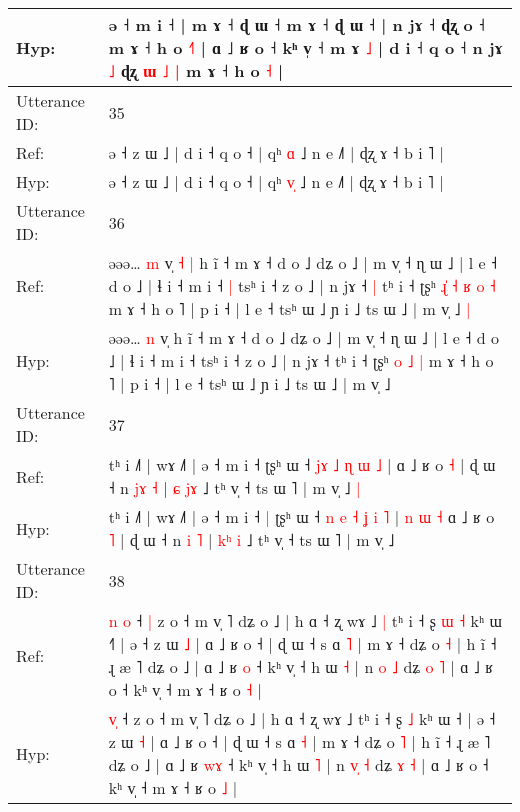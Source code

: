 \documentclass[10pt]{article}
\DeclareRobustCommand{\hl}[1]{{\textcolor{red}{#1}}}
\begin{document}
\begin{longtable}{ll}
 \\
Hyp: & ə ˧ m i ˧ | m ɤ ˧ ɖ ɯ ˧ m ɤ ˧ ɖ ɯ ˧ | n jɤ ˧\hl{}\hl{} ɖʐ\hl{}\hl{}\hl{}\hl{}\hl{}\hl{} o ˧ m ɤ ˧ h o \hl{˧}˥ | ɑ ˩ ʁ o ˧\hl{}\hl{} kʰ v̩ ˧ m\hl{}\hl{}\hl{}\hl{} \hl{}ɤ \hl{˩} | d i ˧ q o ˧\hl{}\hl{} n jɤ\hl{}\hl{} \hl{˩} ɖʐ\hl{}\hl{}\hl{}\hl{} \hl{ɯ} \hl{˩} \hl{|} m ɤ ˧ h o \hl{˧} |
 \\
\midrule
Utterance ID: & 35 \\
Ref: & ə ˧ z ɯ ˩ | d i ˧ q o ˧ | qʰ \hl{}\hl{ɑ} ˩ n e ˩˥ | ɖʐ ɤ ˧ b i ˥ |
 \\
Hyp: & ə ˧ z ɯ ˩ | d i ˧ q o ˧ | qʰ \hl{v}\hl{̩} ˩ n e ˩˥ | ɖʐ ɤ ˧ b i ˥ |
 \\
\midrule
Utterance ID: & 36 \\
Ref: & əəə… \hl{m} v̩\hl{ }\hl{˧}\hl{ }\hl{|} h ĩ ˧ m ɤ ˧ d o ˩ dʑ o ˩ | m v̩ ˧ ɳ ɯ ˩ | l e ˧ d o ˩ | ɬ i ˧ m i ˧\hl{ }\hl{|} tsʰ i ˧ z o ˩ | n jɤ ˧\hl{ }\hl{|} tʰ i ˧ ʈʂʰ\hl{ }\hl{ɻ}\hl{̍}\hl{ }\hl{˧} \hl{ʁ} \hl{o} \hl{˧} m ɤ ˧ h o ˥ | p i ˧ | l e ˧ tsʰ ɯ ˩ ɲ i ˩ ts ɯ ˩ | m v̩ ˩\hl{ }\hl{|}
 \\
Hyp: & əəə… \hl{n} v̩\hl{}\hl{}\hl{}\hl{} h ĩ ˧ m ɤ ˧ d o ˩ dʑ o ˩ | m v̩ ˧ ɳ ɯ ˩ | l e ˧ d o ˩ | ɬ i ˧ m i ˧\hl{}\hl{} tsʰ i ˧ z o ˩ | n jɤ ˧\hl{}\hl{} tʰ i ˧ ʈʂʰ\hl{}\hl{}\hl{}\hl{}\hl{} \hl{o} \hl{˩} \hl{|} m ɤ ˧ h o ˥ | p i ˧ | l e ˧ tsʰ ɯ ˩ ɲ i ˩ ts ɯ ˩ | m v̩ ˩\hl{}\hl{}
 \\
\midrule
Utterance ID: & 37 \\
Ref: & tʰ i ˩˥ | wɤ ˩˥ | ə ˧ m i ˧\hl{}\hl{} ʈʂʰ ɯ ˧ \hl{}\hl{j}\hl{ɤ} \hl{˩} \hl{ɳ} \hl{ɯ} \hl{˩} |\hl{}\hl{}\hl{}\hl{}\hl{}\hl{} ɑ ˩ ʁ o \hl{˧} | ɖ ɯ ˧ n \hl{j}\hl{ɤ} \hl{˧} | \hl{ɕ}\hl{ }\hl{j}\hl{ɤ} ˩ tʰ v̩ ˧ ts ɯ ˥ | m v̩ ˩\hl{ }\hl{|}
 \\
Hyp: & tʰ i ˩˥ | wɤ ˩˥ | ə ˧ m i ˧\hl{ }\hl{|} ʈʂʰ ɯ ˧ \hl{n}\hl{ }\hl{e} \hl{˧} \hl{ʝ} \hl{i} \hl{˥} |\hl{ }\hl{n}\hl{ }\hl{ɯ}\hl{ }\hl{˧} ɑ ˩ ʁ o \hl{˥} | ɖ ɯ ˧ n \hl{}\hl{i} \hl{˥} | \hl{k}\hl{ʰ}\hl{ }\hl{i} ˩ tʰ v̩ ˧ ts ɯ ˥ | m v̩ ˩\hl{}\hl{}
 \\
\midrule
Utterance ID: & 38 \\
Ref: & \hl{n}\hl{ }\hl{o} ˧\hl{ }\hl{|} z o ˧ m v̩ ˥ dʑ o ˩ | h ɑ ˧ ʐ wɤ ˩\hl{ }\hl{|} tʰ i ˧ ʂ\hl{ }\hl{ɯ} \hl{˧} kʰ ɯ ˧\hl{˥} | ə ˧ z ɯ \hl{˩} | ɑ ˩ ʁ o ˧ | ɖ ɯ ˧ s ɑ \hl{˥} | m ɤ ˧ dʑ o \hl{˧} | h ĩ ˧ ɻ æ ˥ dʑ o ˩ | ɑ ˩ ʁ \hl{}\hl{o} ˧ kʰ v̩ ˧ h ɯ \hl{˧} | n \hl{}\hl{o} \hl{˩} dʑ \hl{o} \hl{˥} | ɑ ˩ ʁ o ˧ kʰ v̩ ˧ m ɤ ˧ ʁ o \hl{˧} |
 \\
Hyp: & \hl{}\hl{v}\hl{̩} ˧\hl{}\hl{} z o ˧ m v̩ ˥ dʑ o ˩ | h ɑ ˧ ʐ wɤ ˩\hl{}\hl{} tʰ i ˧ ʂ\hl{}\hl{} \hl{˩} kʰ ɯ ˧\hl{} | ə ˧ z ɯ \hl{˧} | ɑ ˩ ʁ o ˧ | ɖ ɯ ˧ s ɑ \hl{˧} | m ɤ ˧ dʑ o \hl{˥} | h ĩ ˧ ɻ æ ˥ dʑ o ˩ | ɑ ˩ ʁ \hl{w}\hl{ɤ} ˧ kʰ v̩ ˧ h ɯ \hl{˥} | n \hl{v}\hl{̩} \hl{˧} dʑ \hl{ɤ} \hl{˧} | ɑ ˩ ʁ o ˧ kʰ v̩ ˧ m ɤ ˧ ʁ o \hl{˩} |

\end{longtable}
\end{document}
